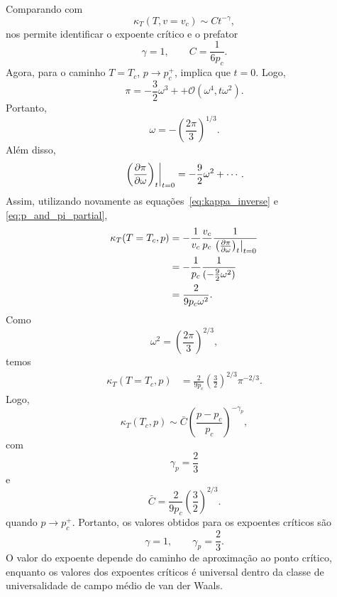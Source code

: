 \documentclass[11pt,a4paper]{article}
\begin{document}
%
Comparando com
%
\begin{equation}
    \kappa_T(T, v=v_c) \sim Ct^{-\gamma},
\end{equation}
%
nos permite identificar o expoente crítico e o prefator
%
\begin{equation}
    \boxed{\gamma=1},
    \qquad
    \boxed{C=\frac{1}{6p_c}}.
\end{equation}
%
Agora, para o caminho $T=T_c$, $p\to p_c^+$, implica que $t=0$.
%
Logo,
%
\begin{equation}
    \pi
    =
    -\frac32\omega^3
    +
    +\mathcal{O}(\omega^4, t\omega^2).
\end{equation}
%
Portanto,
%
\begin{equation}
    \omega
    =
    -\left(\frac{2\pi}{3}\right)^{1/3}.
\end{equation}
%
Além disso,
%
\begin{equation}
    \left.
    \left(\pdv{\pi}{\omega}\right)_t
    \right|_{t=0}
    =
    -\frac92\omega^2+\cdots.
\end{equation}
%
Assim, utilizando novamente as equações~\ref{eq:kappa_inverse} e \ref{eq:p_and_pi_partial},
%
\begin{align}
    \kappa_T(T=T_c, p)
    &=
    -\frac{1}{v_c}
    \frac{v_c}{p_c}
    \frac{1}{\left.
    \left(\pdv{\pi}{\omega}\right)_t
    \right|_{t=0}}
    \\
    &=
    -\frac{1}{p_c}
    \frac{1}{(-\frac92\omega^2)}
    \\
    &=
    \frac{2}{9p_c\omega^2}.
\end{align}
%
Como
%
\begin{equation}
    \omega^2
    =
    \left(\frac{2\pi}{3}\right)^{2/3},
\end{equation}
%
temos
%
\begin{align}
    \kappa_T(T=T_c, p)
    &=
    \frac{2}{9p_c}
    \left(\frac{3}{2}\right)^{2/3}
    \pi^{-2/3}.
\end{align}
%
Logo,
%
\begin{equation}
    \boxed{
    \kappa_T(T_c,p)
    \sim
    \bar C
    \left(
    \frac{p-p_c}{p_c}
    \right)^{-\gamma_p},
    }
\end{equation}
%
com
%
\begin{equation}
    \boxed{\gamma_p=\frac23}
\end{equation}
%
e
%
\begin{equation}
    \boxed{
    \bar C
    =
    \frac{2}{9p_c}
    \left(\frac32\right)^{2/3}.
    }
\end{equation}
%
quando $p\to p_c^+$. Portanto, os valores obtidos para os expoentes críticos são
%
\begin{equation}
    \boxed{
    \gamma=1,
    \qquad
    \gamma_p=\frac23.
    }
\end{equation}
%
O valor do expoente depende do caminho de aproximação ao ponto crítico, enquanto os valores dos expoentes críticos é universal dentro da classe de universalidade de campo médio de van der Waals.
\end{document}
